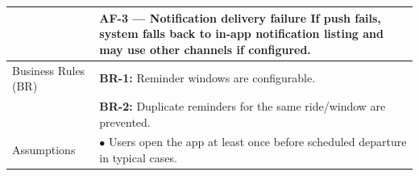 \begin{longtable}{|>{\raggedright\arraybackslash}p{4cm}|>{\raggedright\arraybackslash}p{11cm}|}
& \textbf{AF-3 — Notification delivery failure} \newline If push fails, system falls back to in-app notification listing and may use other channels if configured. \\
\hline
Business Rules (BR) & \textbf{BR-1:} Reminder windows are configurable. \\
& \textbf{BR-2:} Duplicate reminders for the same ride/window are prevented. \\
\hline
Assumptions & $\bullet$ Users open the app at least once before scheduled departure in typical cases. \\
\end{longtable}

